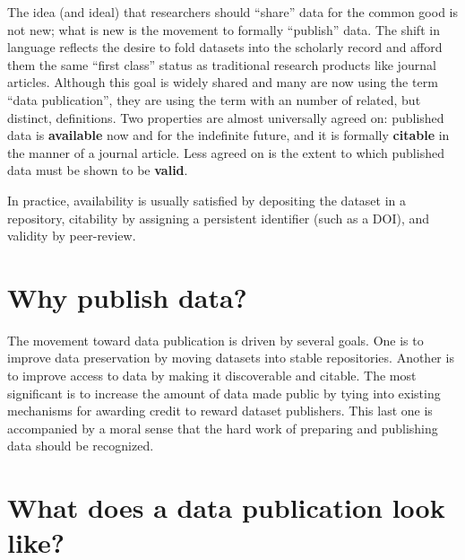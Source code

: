\documentclass[10pt,a4paper,twocolumn]{article}
\begin{document}
The idea (and ideal) that researchers should ``share'' data for the common good is not new; what is new is the movement to formally ``publish'' data.
The shift in language reflects the desire to fold datasets into the scholarly record and afford them the same ``first class'' status as traditional research products like journal articles.
Although this goal is widely shared and many are now using the term ``data publication'', they are using the term with an number of related, but distinct, definitions.
Two properties are almost universally agreed on: published data is \textbf{available} now and for the indefinite future, and it is formally \textbf{citable} in the manner of a journal article. 
Less agreed on is the extent to which published data must be shown to be \textbf{valid}.


In practice, availability is usually satisfied by depositing the dataset in a repository, citability by assigning a persistent identifier (such as a DOI), and validity by peer-review.

\section*{Why publish data?}\label{why-publish-data}

The movement toward data publication is driven by several goals.
One is to improve data preservation by moving datasets into stable repositories.
Another is to improve access to data by making it discoverable and citable.
The most significant is to increase the amount of data made public by tying into existing mechanisms for awarding credit to reward dataset publishers.
This last one is accompanied by a moral sense that the hard work of preparing and publishing data should be recognized.

\section*{What does a data publication look like?}\label{what-does-a-data-publication-look-like}
\end{document}
